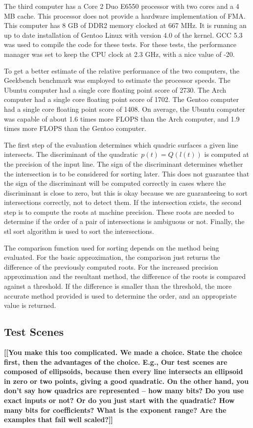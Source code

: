 \documentclass{cccg16}
\def\Jack#1{{\bf [[#1]]}\ignorespaces}
\begin{document}
The third computer has a Core 2 Duo E6550 processor with two cores and
a 4 MB cache.  This processor does not provide a hardware
implementation of FMA.  This computer has 8 GB of DDR2 memory clocked
at 667 MHz.  It is running an up to date installation of Gentoo Linux
with version 4.0 of the kernel.  GCC 5.3 was used to compile the code
for these tests.  For these tests, the performance manager was set to
keep the CPU clock at 2.3 GHz, with a nice value of -20.

To get a better estimate of the relative performance of the two
computers, the Geekbench benchmark was employed to estimate the
processor speeds.  The Ubuntu computer had a single core floating
point score of 2730.  The Arch computer had a single core floating
point score of 1702.  The Gentoo computer had a single core floating
point score of 1408.  On average, the Ubuntu computer was capable of
about 1.6 times more FLOPS than the Arch computer, and 1.9 times more
FLOPS than the Gentoo computer.

The first step of the evaluation determines which quadric surfaces a
given line intersects.  The discriminant of the
quadratic~$p(t)=Q(l(t))$ is computed at the precision of the input
line.  The sign of the discriminant determines whether the
intersection is to be considered for sorting later.  This does not
guarantee that the sign of the discriminant will be computed correctly
in cases where the discriminant is close to zero, but this is okay
because we are guaranteeing to sort intersections correctly, not to
detect them.  If the intersection exists, the second step is to
compute the roots at machine precision.  These roots are needed to
determine if the order of a pair of intersections is ambiguous or not.
Finally, the stl sort algorithm is used to sort the intersections.

The comparison function used for sorting depends on the method being
evaluated.  For the basic approximation, the comparison just returns
the difference of the previously computed roots.  For the increased
precision approximation and the resultant method, the difference of
the roots is compared against a threshold.  If the difference is
smaller than the threshold, the more accurate method provided is used
to determine the order, and an appropriate value is returned.

\subsection{Test Scenes}
\Jack{You make this
  too complicated.  We made a choice.  State the choice first, then
  the advantages of the choice.  E.g., Our test scenes are composed of
  ellipsoids, because then every line intersects an ellipsoid in zero
  or two points, giving a good quadratic.  On the other hand, you
  don't say how quadrics are represented -- how many bits?  Do you use
  exact inputs or not? Or do you just start with the quadratic?  How
  many bits for coefficients?  What is the exponent range?  Are the
  examples that fail well scaled?}
\end{document}
